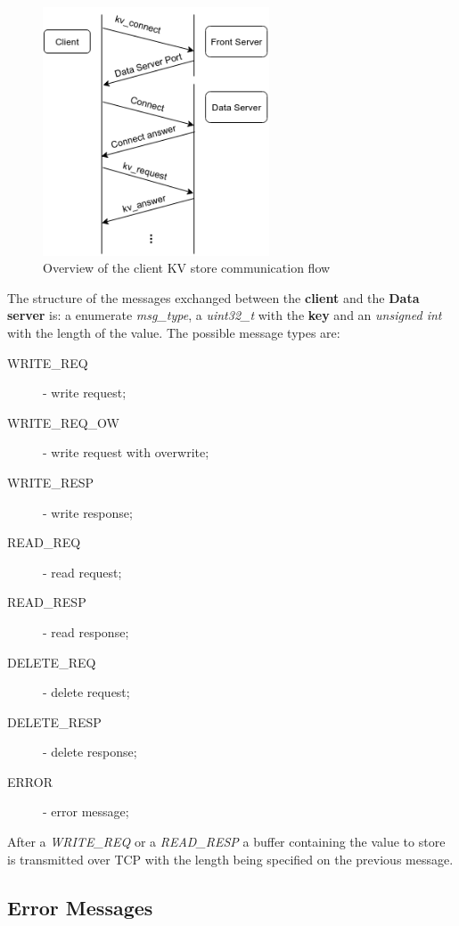 \documentclass[12pt]{article} %
\begin{document}
\begin{figure}[H]
\centering
\includegraphics[width=0.6\textwidth]{./Pictures/CommunicationFlow.png}
\caption{Overview of the client KV store communication flow}\label{fig:Comms}
\end{figure}

The structure of the messages exchanged between the \textbf{client} and the \textbf{Data server} is:  a  enumerate \emph{msg\_type}, a \emph{uint32\_t} with the \textbf{key} and an \emph{unsigned int} with the length of the value. The possible message types are:
\begin{description}
    \item[WRITE\_REQ] - write request;
    \item[WRITE\_REQ\_OW] - write request with overwrite;
    \item[WRITE\_RESP] - write response;
    \item[READ\_REQ] - read request;
    \item[READ\_RESP] - read response;
    \item[DELETE\_REQ] - delete request;
    \item[DELETE\_RESP] - delete response;
    \item[ERROR] - error message;
\end{description}
After a \emph{WRITE\_REQ} or a \emph{READ\_RESP} a buffer containing the value to store is transmitted over TCP with the length being specified on the previous message.


\subsection{Error Messages}
\label{sub:ErrorMessages}
\end{document}

